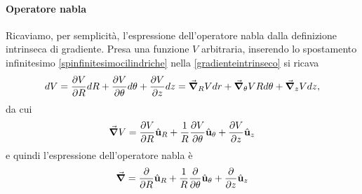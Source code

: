 \paragraph{Operatore nabla}
Ricaviamo, per semplicità, l'espressione dell'operatore nabla dalla definizione intrinseca di gradiente. Presa una funzione $V$ arbitraria, inserendo lo spostamento infinitesimo \ref{spinfinitesimocilindriche} nella \ref{gradienteintrinseco} si ricava
\begin{equation*}
	dV=\pdv{V}{R}dR+\pdv{V}{\theta}d\theta+\pdv{V}{z}dz=\grad_R{V}dr+\grad_\theta{V}Rd\theta+\grad_z{V}dz,
\end{equation*}
da cui
\begin{equation}
	\grad{V}=\pdv{V}{R}\hat{\mathbf{u}}_R+\frac{1}{R}\pdv{V}{\theta}\hat{\mathbf{u}}_\theta+\pdv{V}{z}\hat{\mathbf{u}}_z
\end{equation}
e quindi l'espressione dell'operatore nabla è
\begin{equation}
	\grad =\pdv{R}\hat{\mathbf{u}}_R+\frac{1}{R}\pdv{\theta}\hat{\mathbf{u}}_\theta+\pdv{z}\hat{\mathbf{u}}_z
\end{equation}
